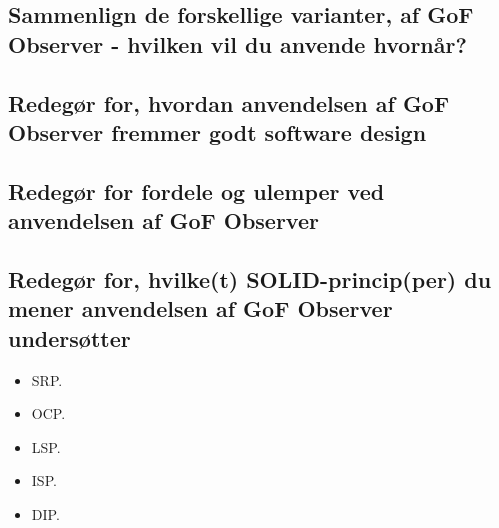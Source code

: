 \subsection{Sammenlign de forskellige varianter, af GoF Observer - hvilken vil du anvende hvornår?}

\subsection{Redegør for, hvordan anvendelsen af GoF Observer fremmer godt software design}

\subsection{Redegør for fordele og ulemper ved anvendelsen af GoF Observer}

\subsection{Redegør for, hvilke(t) SOLID-princip(per) du mener anvendelsen af GoF Observer undersøtter}

\begin{itemize}
	\item SRP.
	\item OCP.
	\item LSP.
	\item ISP.
	\item DIP.
\end{itemize}